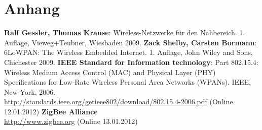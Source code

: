 \section{Anhang}

\listoffigures

\listoftables

\printglossary

\begin{thebibliography}{}
   \textbf{Ralf Gessler, Thomas Krause}: Wireless-Netzwerke für den Nahbereich. 1.  Auflage, Vieweg+Teubner, Wiesbaden 2009.
   \textbf{Zack Shelby, Carsten Bormann}: 6LoWPAN: The Wireless Embedded Internet. 1.  Auflage, John Wiley and Sons, Chichester 2009.
   \textbf{IEEE Standard for Information technology}: Part 802.15.4: Wireless Medium Access Control (MAC) and Physical Layer (PHY) Specifications for Low-Rate Wireless Personal Area Networks (WPANs). IEEE, New York, 2006.\\
\url{http://standards.ieee.org/getieee802/download/802.15.4-2006.pdf} (Online 12.01.2012)
   \textbf{ZigBee Alliance}\\
\url{http://www.zigbee.org} (Online 13.01.2012)
\end{thebibliography}

